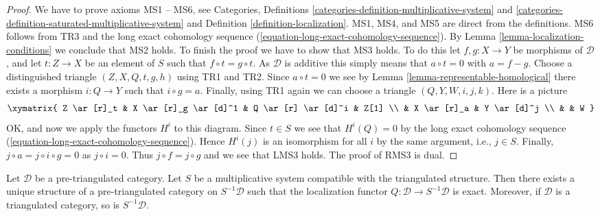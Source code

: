 \begin{proof}
We have to prove axioms MS1 -- MS6, see
Categories, Definitions \ref{categories-definition-multiplicative-system} and
\ref{categories-definition-saturated-multiplicative-system}
and
Definition \ref{definition-localization}.
MS1, MS4, and MS5 are direct from the definitions.
MS6 follows from TR3 and the long exact cohomology sequence
(\ref{equation-long-exact-cohomology-sequence}).
By
Lemma \ref{lemma-localization-conditions}
we conclude that MS2 holds. To finish the proof we have to show that
MS3 holds. To do this let $f, g : X \to Y$ be morphisms of $\mathcal{D}$,
and let $t : Z \to X$ be an element of $S$ such that $f \circ t = g \circ t$.
As $\mathcal{D}$ is additive this simply means that $a \circ t = 0$ with
$a = f - g$. Choose a distinguished triangle $(Z, X, Q, t, g, h)$ using
TR1 and TR2. Since $a \circ t = 0$ we see by
Lemma \ref{lemma-representable-homological}
there exists a morphism $i : Q \to Y$ such that $i \circ g = a$.
Finally, using TR1 again we can choose a triangle
$(Q, Y, W, i, j, k)$. Here is a picture
$$
\xymatrix{
Z \ar[r]_t & X \ar[r]_g \ar[d]^1 & Q \ar[r] \ar[d]^i & Z[1] \\
& X \ar[r]_a & Y \ar[d]^j \\
& & W
}
$$
OK, and now we apply the functors $H^i$ to this diagram.
Since $t \in S$ we see that $H^i(Q) = 0$ by the long exact cohomology
sequence (\ref{equation-long-exact-cohomology-sequence}).
Hence $H^i(j)$ is an isomorphism for all $i$ by the same argument,
i.e., $j \in S$. Finally, $j \circ a = j \circ i \circ g = 0$ as
$j \circ i = 0$. Thus $j \circ f = j \circ g$ and we see that LMS3 holds.
The proof of RMS3 is dual.
\end{proof}

\begin{proposition}
\label{proposition-construct-localization}
Let $\mathcal{D}$ be a pre-triangulated category. Let $S$ be a multiplicative
system compatible with the triangulated structure.
Then there exists a unique structure of a pre-triangulated category on
$S^{-1}\mathcal{D}$ such that the localization functor
$Q : \mathcal{D} \to S^{-1}\mathcal{D}$ is exact.
Moreover, if $\mathcal{D}$ is a triangulated category, so is
$S^{-1}\mathcal{D}$.
\end{proposition}

